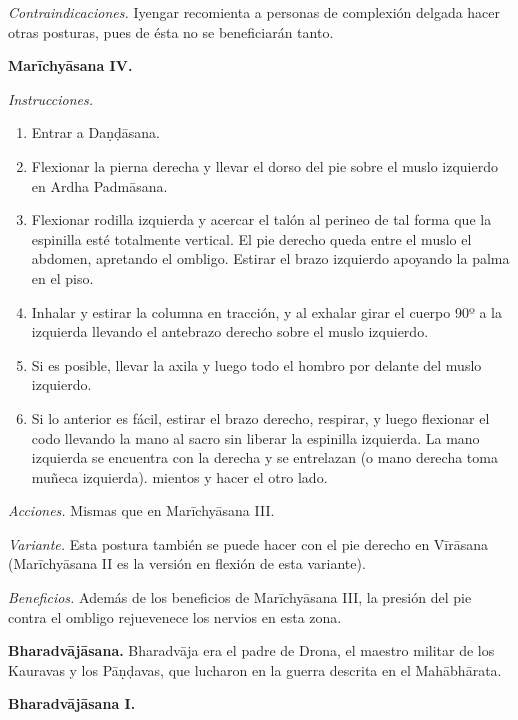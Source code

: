 \emph{Contraindicaciones.} Iyengar recomienta
a personas de complexión delgada hacer otras
posturas, pues de ésta no se beneficiarán
tanto.

\medskip\noindent\textbf{Marīchyāsana IV.}

\emph{Instrucciones.}
\begin{enumerate}
\item Entrar a Daṇḍāsana.
\item Flexionar la pierna derecha y llevar el
dorso del pie sobre el muslo izquierdo en
Ardha Padmāsana.
\item Flexionar rodilla izquierda y acercar
el talón al perineo de tal forma que la
espinilla esté totalmente vertical. El pie
derecho queda entre el muslo el abdomen,
apretando el ombligo. Estirar el brazo
izquierdo apoyando la palma en el piso.
\item Inhalar y estirar la columna en
tracción, y al exhalar girar el cuerpo 90º a
la izquierda llevando el antebrazo derecho
sobre el muslo izquierdo.
\item Si es posible, llevar la axila y luego
todo el hombro por delante del muslo
izquierdo.
\item Si lo anterior es fácil, estirar el
brazo derecho, respirar, y luego flexionar el
codo llevando la mano al sacro sin liberar la
espinilla izquierda. La mano izquierda se
encuentra con la derecha y se entrelazan (o
mano derecha toma muñeca izquierda). mientos
y hacer el otro lado.
\end{enumerate}

\emph{Acciones.} Mismas que en Marīchyāsana
III.

\emph{Variante.} Esta postura también se
puede hacer con el pie derecho en Vīrāsana
(Marīchyāsana II es la versión en flexión de
esta variante).

\emph{Beneficios.} Además de los beneficios
de Marīchyāsana III, la presión del pie
contra el ombligo rejuevenece los nervios en
esta zona.

\medskip\noindent\textbf{Bharadvājāsana.}
Bharadvāja era el padre de Drona, el maestro
militar de los Kauravas y los Pāṇḍavas, que
lucharon en la guerra descrita en el
Mahābhārata.

\medskip\noindent\textbf{Bharadvājāsana I.}

